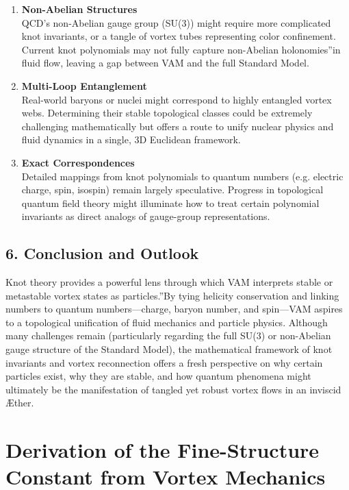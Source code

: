 \documentclass[a4paper,12pt]{article}
\begin{document}
\begin{enumerate}
    \item \textbf{Non-Abelian Structures} \\
    QCD's non-Abelian gauge group (SU(3)) might require more complicated knot invariants, or a tangle of vortex tubes representing color confinement. Current knot polynomials may not fully capture non-Abelian \grqq holonomies\textquotedblright in fluid flow, leaving a gap between VAM and the full Standard Model.
    \item \textbf{Multi-Loop Entanglement} \\
    Real-world baryons or nuclei might correspond to highly entangled vortex webs. Determining their stable topological classes could be extremely challenging mathematically but offers a route to unify nuclear physics and fluid dynamics in a single, 3D Euclidean framework.
    \item \textbf{Exact Correspondences} \\
    Detailed mappings from knot polynomials to quantum numbers (e.g. electric charge, spin, isospin) remain largely speculative. Progress in topological quantum field theory might illuminate how to treat certain polynomial invariants as direct analogs of gauge-group representations.
\end{enumerate}

\subsection*{6. Conclusion and Outlook}

Knot theory provides a powerful lens through which VAM interprets stable or metastable vortex states as \grqq particles.\textquotedblright By tying helicity conservation and linking numbers to quantum numbers—charge, baryon number, and spin—VAM aspires to a topological unification of fluid mechanics and particle physics. Although many challenges remain (particularly regarding the full SU(3) or non-Abelian gauge structure of the Standard Model), the mathematical framework of knot invariants and vortex reconnection offers a fresh perspective on why certain particles exist, why they are stable, and how quantum phenomena might ultimately be the manifestation of tangled yet robust vortex flows in an inviscid Æther.
\label{appendix:6}


\section{Derivation of the Fine-Structure Constant from Vortex Mechanics}
\label{sec:appendix-alpha}
\end{document}
